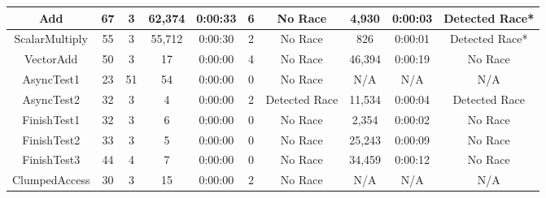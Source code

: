 \begin{table*}
{\begin{tabular}{|c|c|c|c|c|c|c|c|c|c|}
\\ \hline
Add & 67 & 3 & 62,374 & 0:00:33 & 6 & No Race & 4,930 & 0:00:03 & Detected Race*
\\ \hline
ScalarMultiply & 55 & 3 & 55,712 & 0:00:30 & 2 & No Race & 826 & 0:00:01 & Detected Race*
\\ \hline
VectorAdd & 50 & 3 & 17 & 0:00:00 & 4 & No Race & 46,394 & 0:00:19 & No Race
\\ \hline
AsyncTest1 & 23 & 51 & 54 & 0:00:00 & 0 & No Race & N/A & N/A & N/A
\\ \hline
AsyncTest2 & 32 & 3 & 4 & 0:00:00 & 2 & Detected Race & 11,534 & 0:00:04 
& Detected Race \\ \hline
FinishTest1 & 32 & 3 & 6 & 0:00:00 & 0 & No Race & 2,354 & 0:00:02 & No Race
\\ \hline
FinishTest2 & 33 & 3 & 5 & 0:00:00 & 0 & No Race & 25,243 & 0:00:09 & No Race
\\ \hline
FinishTest3 & 44 & 4 & 7 & 0:00:00 & 0 & No Race & 34,459 & 0:00:12 & No Race
\\ \hline
ClumpedAccess & 30 & 3 & 15 & 0:00:00 & 2 & No Race & N/A & N/A & N/A
\\ \hline
\end{tabular}}
\end{table*}


